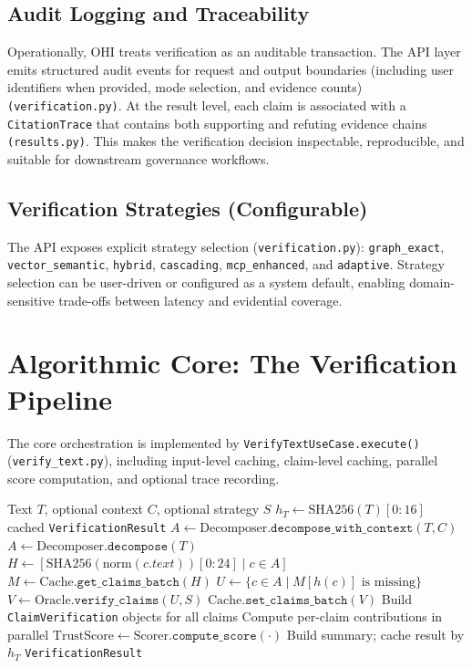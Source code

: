 \documentclass[10pt,a4paper,twocolumn]{article}
\begin{document}
\subsection{Audit Logging and Traceability}
Operationally, OHI treats verification as an auditable transaction. The API layer emits structured audit events for request and output boundaries (including user identifiers when provided, mode selection, and evidence counts) \texttt{(verification.py)}. At the result level, each claim is associated with a \texttt{CitationTrace} that contains both supporting and refuting evidence chains \texttt{(results.py)}. This makes the verification decision inspectable, reproducible, and suitable for downstream governance workflows.

\subsection{Verification Strategies (Configurable)}
The API exposes explicit strategy selection (\texttt{verification.py}): \texttt{graph\_exact}, \texttt{vector\_semantic}, \texttt{hybrid}, \texttt{cascading}, \texttt{mcp\_enhanced}, and \texttt{adaptive}. Strategy selection can be user-driven or configured as a system default, enabling domain-sensitive trade-offs between latency and evidential coverage.

\section{Algorithmic Core: The Verification Pipeline}

The core orchestration is implemented by \texttt{VerifyTextUseCase.execute()} (\texttt{verify\_text.py}), including input-level caching, claim-level caching, parallel score computation, and optional trace recording.

\begin{algorithm}[t]
\caption{\texttt{VerifyTextUseCase} (simplified)}
\label{alg:verify}
\begin{algorithmic}[1]
\Require Text $T$, optional context $C$, optional strategy $S$
\State $h_T \gets \mathrm{SHA256}(T)[0:16]$
  \State \Return cached \texttt{VerificationResult}
\EndIf
{}
  \State $A \gets \mathrm{Decomposer}.\texttt{decompose\_with\_context}(T,C)$
\Else
  \State $A \gets \mathrm{Decomposer}.\texttt{decompose}(T)$
\EndIf
\State $H \gets [\mathrm{SHA256}(\mathrm{norm}(c.text))[0:24] \mid c \in A]$
\State $M \gets \mathrm{Cache}.\texttt{get\_claims\_batch}(H)$
\State $U \gets \{c \in A \mid M[h(c)] \text{ is missing}\}$
  \State $V \gets \mathrm{Oracle}.\texttt{verify\_claims}(U,S)$
  \State $\mathrm{Cache}.\texttt{set\_claims\_batch}(V)$
\EndIf
\State Build \texttt{ClaimVerification} objects for all claims
\State Compute per-claim contributions in parallel
\State $\mathrm{TrustScore} \gets \mathrm{Scorer}.\texttt{compute\_score}(\cdot)$
\State Build summary; cache result by $h_T$
\State \Return \texttt{VerificationResult}
\end{algorithmic}
\end{algorithm}
\end{document}
